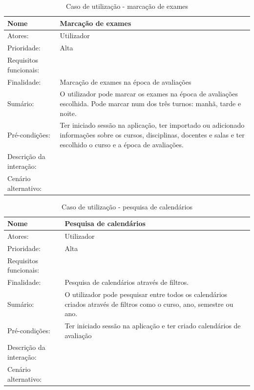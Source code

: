 \documentclass[11pt, twoside]{report}
\begin{document}
\begin{table}[H]
	\caption{Caso de utilização - marcação de exames}
	\begin{center}	
		\begin{tabularx}{\textwidth}{|l|X|}
			\hline
			\textbf{Nome }	& \textbf{Marcação de exames} \\
			\hline
			Atores: & Utilizador\\
			\hline
			Prioridade: &  Alta\\
			\hline
			Requisitos funcionais:&  \\
			\hline
			Finalidade: & Marcação de exames na época de avaliações\\
			\hline
			Sumário: & O utilizador pode marcar os exames na época de avaliações escolhida. Pode marcar num dos três turnos: manhã, tarde e noite.\\
			\hline
			Pré-condições: & Ter iniciado sessão na aplicação, ter importado ou adicionado informações sobre os cursos, disciplinas, docentes e salas e ter escolhido o curso e a época de avaliações.\\
			\hline
			Descrição da interação: &  \\
			\hline
			Cenário alternativo: &\\
			\hline
		\end{tabularx}
	\end{center}
\end{table}


	
	

\begin{table}[H]
	\caption{Caso de utilização - pesquisa de calendários}
	\begin{center}	
		\begin{tabularx}{\textwidth}{|l|X|}
			\hline
			\textbf{Nome }	& \textbf{Pesquisa de calendários} \\
			\hline
			Atores: & Utilizador\\
			\hline
			Prioridade: &  Alta\\
			\hline
			Requisitos funcionais:&  \\
			\hline
			Finalidade: & Pesquisa de calendários através de filtros.\\
			\hline
			Sumário: & O utilizador pode pesquisar entre todos os calendários criados através de filtros como o curso, ano, semestre ou ano.\\
			\hline
			Pré-condições: & Ter iniciado sessão na aplicação e ter criado calendários de avaliação\\
			\hline
			Descrição da interação: &  \\
			\hline
			Cenário alternativo: &\\
			\hline
		\end{tabularx}
	\end{center}
\end{table}
\end{document}
